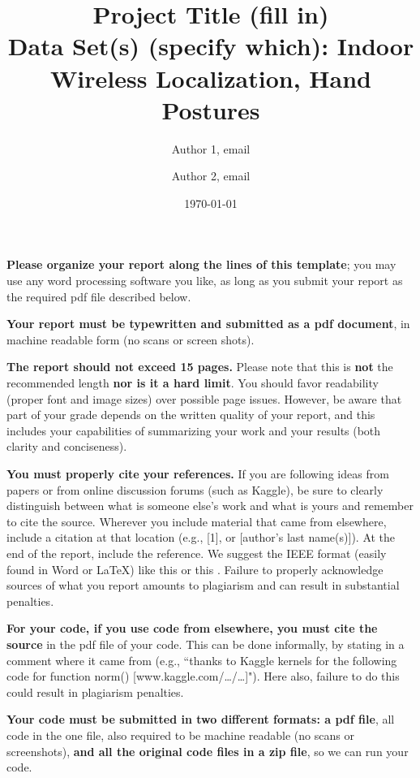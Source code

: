 \documentclass[singlecolumn]{article}
\begin{document}
\title{Project Title (fill in)\\
\large Data Set(s) (specify which): Indoor Wireless Localization, Hand Postures}
\author{Author 1, email \and Author 2, email}
\date{\today}
\maketitle

\textbf{Please organize your report along the lines of this template}; you may use any word processing software you like, as long as you submit your report as the required pdf file described below. 

\textbf{Your report must be typewritten and submitted as a pdf document}, in machine readable form (no scans or screen shots).
 
\textbf{The report should not exceed 15 pages.} Please note that this is \textbf{not} the recommended length \textbf{nor is it a hard limit}. You should favor readability (proper font and image sizes) over possible page issues. However, be aware that part of your grade depends on the written quality of your report, and this includes your capabilities of summarizing your work and your results (both clarity and conciseness).

\textbf{You must properly cite your references.} If you are following ideas from papers or from online discussion forums (such as Kaggle), be sure to clearly distinguish between what is someone else’s work and what is yours and remember to cite the source. Wherever you include material that came from elsewhere, include a citation at that location (e.g., [1], or [author’s last name(s)]). At the end of the report, include the reference. We suggest the IEEE format (easily found in Word or \LaTeX) like this \cite{latexReferencing} or this \cite{samplePaper}. Failure to properly acknowledge sources of what you report amounts to plagiarism and can result in substantial penalties. 

\textbf{For your code, if you use code from elsewhere, you must cite the source} in the pdf file of your code. This can be done informally, by stating in a comment where it came from (e.g., ``thanks to Kaggle kernels for the following code for function norm() [www.kaggle.com/…/…]"). Here also, failure to do this could result in plagiarism penalties. 

\textbf{Your code must be submitted in two different formats: a pdf file}, all code in the one file, also required to be machine readable (no scans or screenshots), \textbf{and all the original code files in a zip file}, so we can run your code.
\end{document}
